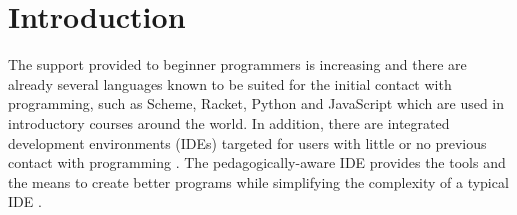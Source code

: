 \section{Introduction}






The support provided to beginner programmers is increasing and there are already
several languages known to be suited for the initial contact with programming, such as Scheme, Racket,
Python and JavaScript which are used in introductory courses around the world.
In addition, there are integrated development environments (IDEs) targeted for
 users with little or no previous contact with programming \cite{kolling2003bluej}. %
The pedagogically-aware %
 IDE provides the tools and the means to create better programs while simplifying
the complexity of a typical IDE \cite{pears2007survey}.%

